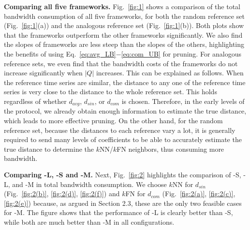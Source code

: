 \textbf{Comparing all five frameworks.}
Fig.~\ref{fig:1} shows a comparison of the total bandwidth consumption
of all five frameworks, for both the random reference set (Fig.~\ref{fig:1}(a))
and the analogous reference set (Fig.~\ref{fig:1}(b)).
Both plots show that the \MSWave{} frameworks outperform the
other frameworks significantly. We also find the slopes of \MSWave{}
frameworks are
less steep than the slopes of the others, highlighting the benefits of
using Eq.~\eqref{eq:avg_LB}$-$\eqref{eq:com_UB} for pruning. For
analogous reference sets, we even find that the bandwidth costs of the 
\MSWave{} frameworks do not increase significantly when $|Q|$ increases. 
This can be explained as follows. When the reference time series are 
similar, the distance to any one of the reference time series is very 
close to the distance to the whole reference set. This holds regardless of 
whether $d_{avg}$, $d_{sin}$, or $d_{com}$ is chosen. Therefore, in
the early levels of the protocol, we already obtain enough information
to estimate the true distance, which leads to more effective
pruning. On the other hand, for the random reference set, because the
distances to each reference vary a lot, it is generally required to
send many levels of coefficients to be able to accurately estimate the
true distance to determine the $k$NN/$k$FN neighbors, thus consuming
more bandwidth.

\textbf{Comparing \MSWave-L{}, \MSWave-S{} and \LeeWave-M{}.}  Next,
Fig.~\ref{fig:2} highlights the comparison of \MSWave-S{}, \MSWave-L{},
and \LeeWave-M{} in total bandwidth consumption. 
We choose $k$NN for $d_{sin}$ (Fig.~\ref{fig:2(b)}, \ref{fig:2(d)},
\ref{fig:2(f)}) and $k$FN for $d_{com}$ (Fig.~\ref{fig:2(a)},
\ref{fig:2(c)}, \ref{fig:2(e)}) because, as argued in
Section 2.3, these are the only two feasible cases for \LeeWave-M{}.
The figure shows that the performance of \MSWave-L{}
is clearly better than \MSWave-S{}, while both are much better than
\LeeWave-M{} in all configurations.
 
